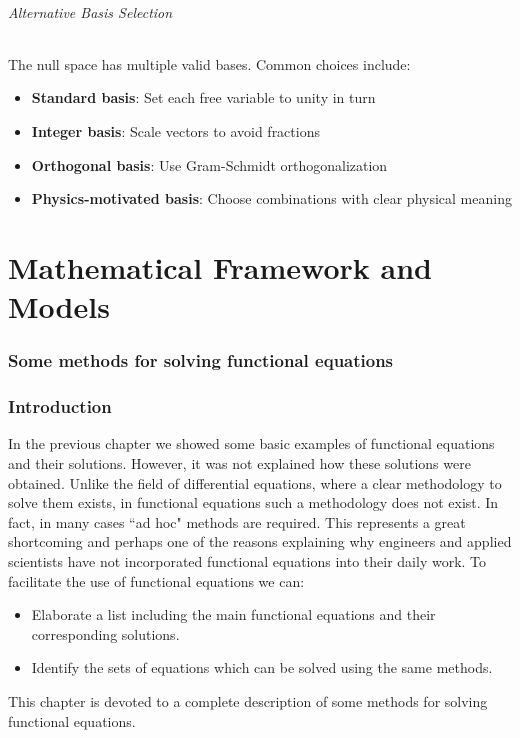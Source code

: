 \documentclass[
	11pt, %
	fleqn, %
	a4paper, %
]{LegrandOrangeBook}
\begin{document}
\paragraph{Alternative Basis Selection}
The null space has multiple valid bases. Common choices include:
\begin{itemize}
\item \textbf{Standard basis}: Set each free variable to unity in turn
\item \textbf{Integer basis}: Scale vectors to avoid fractions
\item \textbf{Orthogonal basis}: Use Gram-Schmidt orthogonalization
\item \textbf{Physics-motivated basis}: Choose combinations with clear physical meaning
\end{itemize}

\part{Mathematical Framework and Models}



\section{Some methods for solving functional equations}\label{c2}

\section{Introduction}\label{s2.1}
In the previous chapter we showed some basic examples of functional
equations and their solutions. However, it was not explained how
these solutions were obtained. Unlike the field of differential
equations, where a clear methodology to solve them exists, in
functional equations such a methodology does not exist. In fact,
in many cases ``ad hoc" methods are required. This represents a
great shortcoming and perhaps one of the reasons explaining why
engineers and applied scientists have not incorporated functional
equations into their daily work. To facilitate the use of
functional equations we can:
\begin{itemize}
\item Elaborate a list including the main functional equations and their corresponding solutions.
\item Identify the sets of equations which can be solved using the same methods.
\end{itemize}
This chapter is devoted to a complete description of some methods
for solving functional equations.
\end{document}
